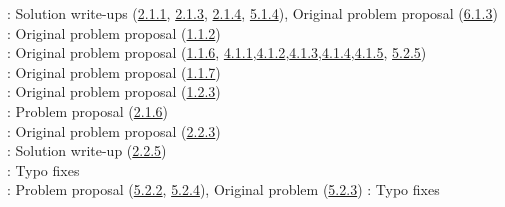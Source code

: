 \Paiya: Solution write-ups (\hyperref[2-1-1]{2.1.1}, \hyperref[2-1-3]{2.1.3}, \hyperref[2-1-4]{2.1.4}, \hyperref[5-1-4]{5.1.4}), Original problem proposal (\hyperref[6-1-3]{6.1.3}) \\
\Ptony: Original problem proposal (\hyperref[1-1-2]{1.1.2})\\
\Ppi: Original problem proposal (\hyperref[1-1-6]{1.1.6}, \hyperref[4-1-1]{4.1.1},\hyperref[4-1-2]{4.1.2},\hyperref[4-1-3]{4.1.3},\hyperref[4-1-4]{4.1.4},\hyperref[4-1-5]{4.1.5}, \hyperref[5-2-5]{5.2.5})\\
\Pbfan: Original problem proposal (\hyperref[1-1-7]{1.1.7})\\
\Pkiesh: Original problem proposal (\hyperref[1-2-3]{1.2.3})\\
\Pchris: Problem proposal (\hyperref[2-1-6]{2.1.6})\\
\Pkee: Original problem proposal (\hyperref[2-2-3]{2.2.3})\\
\PSlas: Solution write-up (\hyperref[2-2-5]{2.2.5})\\
\Parjun: Typo fixes\\
\Pnjoy: Problem proposal (\hyperref[5-2-2]{5.2.2}, \hyperref[5-2-4]{5.2.4}), Original problem (\hyperref[5-2-3]{5.2.3})
\Paops: Typo fixes\\
